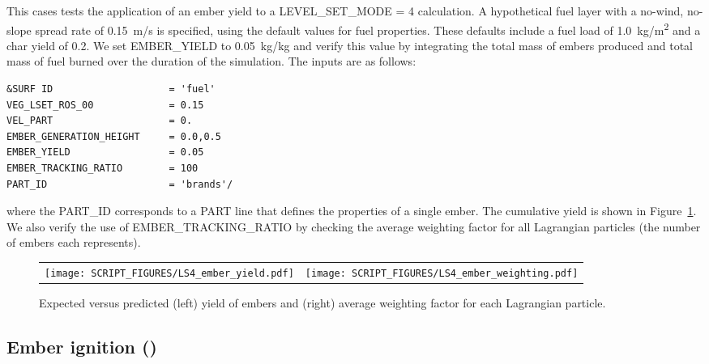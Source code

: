 \documentclass[11pt]{book}
\begin{document}
This cases tests the application of an ember yield to a {\ct LEVEL\_SET\_MODE = 4} calculation. A hypothetical fuel layer with a no-wind, no-slope spread rate of 0.15~m/s is specified, using the default values for fuel properties. These defaults include a fuel load of 1.0~\unit{kg/m^2} and a char yield of 0.2. We set {\ct EMBER\_YIELD} to 0.05~kg/kg and verify this value by integrating the total mass of embers produced and total mass of fuel burned over the duration of the simulation. The inputs are as follows:
\begin{lstlisting}
&SURF ID                    = 'fuel'
VEG_LSET_ROS_00             = 0.15
VEL_PART                    = 0.
EMBER_GENERATION_HEIGHT     = 0.0,0.5
EMBER_YIELD                 = 0.05
EMBER_TRACKING_RATIO        = 100
PART_ID                     = 'brands'/
\end{lstlisting}
where the {\ct PART\_ID} corresponds to a {\ct PART} line that defines the properties of a single ember. The cumulative yield is shown in Figure~\ref{fig:LS4_ember_yield}. We also verify the use of {\ct EMBER\_TRACKING\_RATIO} by checking the average weighting factor for all Lagrangian particles (the number of embers each represents).

\begin{figure}[h]
\begin{center}
\begin{tabular}{cc}
 \texttt{[image: SCRIPT\_FIGURES/LS4\_ember\_yield.pdf]}&
 \texttt{[image: SCRIPT\_FIGURES/LS4\_ember\_weighting.pdf]}\\
\end{tabular}
\end{center}
 \caption[Level set ember generation]{Expected versus predicted (left) yield of embers and (right) average weighting factor for each Lagrangian particle.}
\label{fig:LS4_ember_yield}
\end{figure}


\subsection{Ember ignition (\texorpdfstring{}{LS4\_ember\_ignition})}
\label{LS4_ember_ignition}
\end{document}

